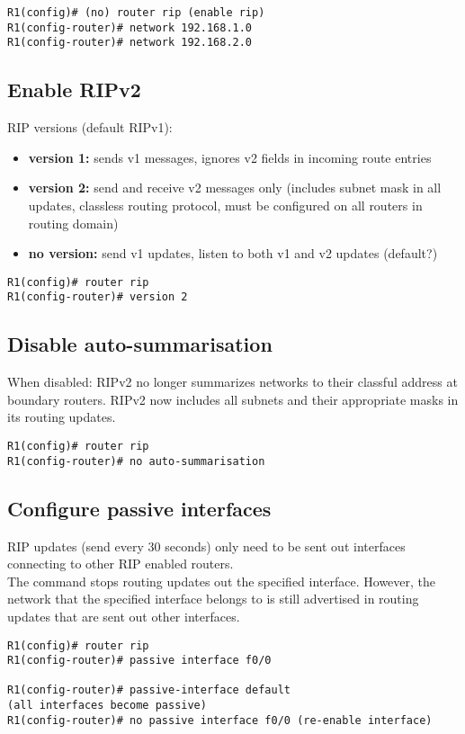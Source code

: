 \documentclass[10pt, a4paper]{article}
\begin{document}
\begin{lstlisting}
R1(config)# (no) router rip (enable rip)
R1(config-router)# network 192.168.1.0
R1(config-router)# network 192.168.2.0
\end{lstlisting}

\subsection{Enable RIPv2}
RIP versions (default RIPv1):
\begin{itemize}[noitemsep,nolistsep]
\item \textbf{version 1:} sends v1 messages, ignores v2 fields in incoming route entries
\item \textbf{version 2:} send and receive v2 messages only (includes subnet mask in all updates, classless routing protocol, must be configured on all routers in routing domain)
\item \textbf{no version:} send v1 updates, listen to both v1 and v2 updates (default?)\\
\end{itemize}
\begin{lstlisting}
R1(config)# router rip
R1(config-router)# version 2
\end{lstlisting}

\subsection{Disable auto-summarisation}
When disabled: RIPv2 no longer summarizes networks to their classful address at boundary routers. RIPv2 now includes all subnets and their appropriate masks in its routing updates.\\
\begin{lstlisting}
R1(config)# router rip
R1(config-router)# no auto-summarisation
\end{lstlisting}

\subsection{Configure passive interfaces}
RIP updates (send every 30 seconds) only need to be sent out interfaces connecting to other RIP enabled routers.\\
The command stops routing updates out the specified interface. However, the network that the specified interface belongs to is still advertised in routing updates that are sent out other interfaces.\\
\begin{lstlisting}
R1(config)# router rip
R1(config-router)# passive interface f0/0

R1(config-router)# passive-interface default
(all interfaces become passive)
R1(config-router)# no passive interface f0/0 (re-enable interface)
\end{lstlisting}
\end{document}
